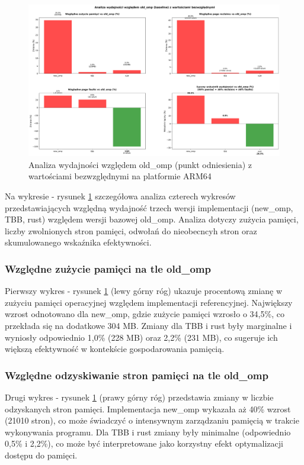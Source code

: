 \begin{figure}[H]
    \centering
    \includegraphics[width=\textwidth]{analiza/images/parallel/cg/arm/chart_05_performance_ratios.png}
    \caption{Analiza wydajności względem old\_omp (punkt odniesienia) z wartościami bezwzględnymi na platformie ARM64}
    \label{cg_analiza_wzgledem_old_omp}
\end{figure}
Na wykresie - rysunek \ref{cg_analiza_wzgledem_old_omp} szczegółowa analiza czterech wykresów przedstawiających względną wydajność trzech wersji implementacji (new\_omp, TBB, rust) względem wersji bazowej old\_omp. Analiza dotyczy zużycia pamięci, liczby zwolnionych stron pamięci, odwołań do nieobecncyh stron oraz skumulowanego wskaźnika efektywności.
\subsubsection{Względne zużycie pamięci na tle old\_omp}
Pierwszy wykres - rysunek \ref{cg_analiza_wzgledem_old_omp} (lewy górny róg) ukazuje procentową zmianę w zużyciu pamięci operacyjnej względem implementacji referencyjnej. Największy wzrost odnotowano dla new\_omp, gdzie zużycie pamięci wzrosło o 34,5\%, co przekłada się na dodatkowe 304 MB. Zmiany dla TBB i rust były marginalne i wyniosły odpowiednio 1,0\% (228 MB) oraz 2,2\% (231 MB), co sugeruje ich większą efektywność w kontekście gospodarowania pamięcią.

\subsubsection{Względne odzyskiwanie stron pamięci na tle old\_omp}
Drugi wykres - rysunek \ref{cg_analiza_wzgledem_old_omp} (prawy górny róg) przedstawia zmiany w liczbie odzyskanych stron pamięci. Implementacja new\_omp wykazała aż 40\% wzrost (21010 stron), co może świadczyć o intensywnym zarządzaniu pamięcią w trakcie wykonywania programu. Dla TBB i rust zmiany były minimalne (odpowiednio 0,5\% i 2,2\%), co może być interpretowane jako korzystny efekt optymalizacji dostępu do pamięci.

